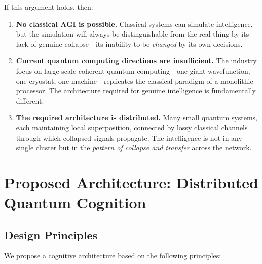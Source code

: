 \documentclass[11pt,a4paper]{article}
\begin{document}
If this argument holds, then:

\begin{enumerate}
    \item \textbf{No classical AGI is possible.} Classical systems can simulate intelligence, but the simulation will always be distinguishable from the real thing by its lack of genuine collapse---its inability to be \emph{changed} by its own decisions.
    \item \textbf{Current quantum computing directions are insufficient.} The industry focus on large-scale coherent quantum computing---one giant wavefunction, one cryostat, one machine---replicates the classical paradigm of a monolithic processor. The architecture required for genuine intelligence is fundamentally different.
    \item \textbf{The required architecture is distributed.} Many small quantum systems, each maintaining local superposition, connected by lossy classical channels through which collapsed signals propagate. The intelligence is not in any single cluster but in the \emph{pattern of collapse and transfer} across the network.
\end{enumerate}

\section{Proposed Architecture: Distributed Quantum Cognition}

\subsection{Design Principles}

We propose a cognitive architecture based on the following principles:
\end{document}
